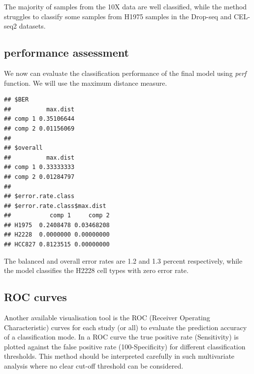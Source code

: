\documentclass[]{book}
\newenvironment{Shaded}{\begin{snugshade}}{\end{snugshade}}
\newcommand{\CommentTok}[1]{\textcolor[rgb]{0.56,0.35,0.01}{\textit{#1}}}
\newcommand{\DataTypeTok}[1]{\textcolor[rgb]{0.13,0.29,0.53}{#1}}
\newcommand{\DecValTok}[1]{\textcolor[rgb]{0.00,0.00,0.81}{#1}}
\newcommand{\KeywordTok}[1]{\textcolor[rgb]{0.13,0.29,0.53}{\textbf{#1}}}
\newcommand{\NormalTok}[1]{#1}
\newcommand{\OperatorTok}[1]{\textcolor[rgb]{0.81,0.36,0.00}{\textbf{#1}}}
\newcommand{\StringTok}[1]{\textcolor[rgb]{0.31,0.60,0.02}{#1}}
\theoremstyle{definition}
\theoremstyle{definition}
\theoremstyle{definition}
\theoremstyle{remark}
\begin{document}
The majority of samples from the 10X data are well classified, while the
method struggles to classify some samples from H1975 samples in the
Drop-seq and CEL-seq2 datasets.

\hypertarget{performance-assessment}{%
\subsection{performance assessment}\label{performance-assessment}}

We now can evaluate the classification performance of the final model
using \emph{perf} function. We will use the maximum distance measure.

\begin{Shaded}
\end{Shaded}

\begin{verbatim}
## $BER
##          max.dist
## comp 1 0.35106644
## comp 2 0.01156069
## 
## $overall
##          max.dist
## comp 1 0.33333333
## comp 2 0.01284797
## 
## $error.rate.class
## $error.rate.class$max.dist
##           comp 1     comp 2
## H1975  0.2408478 0.03468208
## H2228  0.0000000 0.00000000
## HCC827 0.8123515 0.00000000
\end{verbatim}

The balanced and overall error rates are 1.2 and 1.3 percent
respectively, while the model classifies the H2228 cell types with zero
error rate.

\hypertarget{roc-curves}{%
\subsection{ROC curves}\label{roc-curves}}

Another available visualisation tool is the ROC (Receiver Operating
Characteristic) curves for each study (or all) to evaluate the
prediction accuracy of a classification mode. In a ROC curve the true
positive rate (Sensitivity) is plotted against the false positive rate
(100-Specificity) for different classification thresholds. This method
should be interpreted carefully in such multivariate analysis where no
clear cut-off threshold can be considered.
\end{document}
